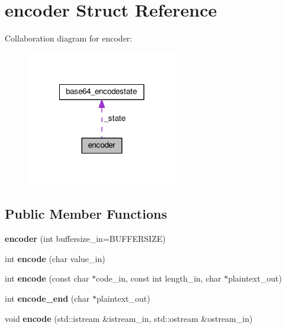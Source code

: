 \hypertarget{structbase64_1_1encoder}{\section{encoder Struct Reference}
\label{structbase64_1_1encoder}
}


Collaboration diagram for encoder\-:\nopagebreak
\begin{figure}[H]
\begin{center}
\leavevmode
\includegraphics[width=186pt]{structbase64_1_1encoder__coll__graph}
\end{center}
\end{figure}
\subsection*{Public Member Functions}
\begin{DoxyCompactItemize}
\item 
\hypertarget{structbase64_1_1encoder_a53baabc4bbcd1213330c98579e5ad0a2}{{\bfseries encoder} (int buffersize\-\_\-in=B\-U\-F\-F\-E\-R\-S\-I\-Z\-E)}\label{structbase64_1_1encoder_a53baabc4bbcd1213330c98579e5ad0a2}

\item 
\hypertarget{structbase64_1_1encoder_ae38a98a537afc3e6952a15d01d3d074d}{int {\bfseries encode} (char value\-\_\-in)}\label{structbase64_1_1encoder_ae38a98a537afc3e6952a15d01d3d074d}

\item 
\hypertarget{structbase64_1_1encoder_a5676f45347ba7ca994d4493c278060e7}{int {\bfseries encode} (const char $\ast$code\-\_\-in, const int length\-\_\-in, char $\ast$plaintext\-\_\-out)}\label{structbase64_1_1encoder_a5676f45347ba7ca994d4493c278060e7}

\item 
\hypertarget{structbase64_1_1encoder_a694bb20cc355b5ed33358970a9b4c615}{int {\bfseries encode\-\_\-end} (char $\ast$plaintext\-\_\-out)}\label{structbase64_1_1encoder_a694bb20cc355b5ed33358970a9b4c615}

\item 
\hypertarget{structbase64_1_1encoder_a3b48510504ae53d21173c22cf6f32ca9}{void {\bfseries encode} (std\-::istream \&istream\-\_\-in, std\-::ostream \&ostream\-\_\-in)}\label{structbase64_1_1encoder_a3b48510504ae53d21173c22cf6f32ca9}

\end{DoxyCompactItemize}
